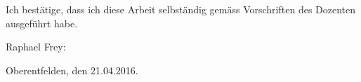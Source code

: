Ich best\"atige, dass ich diese Arbeit selbst\"andig gem\"ass Vorschriften des
Dozenten ausgef\"uhrt habe.

\vspace*{3em}

Raphael Frey:  \underline{\hspace{8cm}}

\vspace*{3em}

Oberentfelden, den 21.04.2016.
